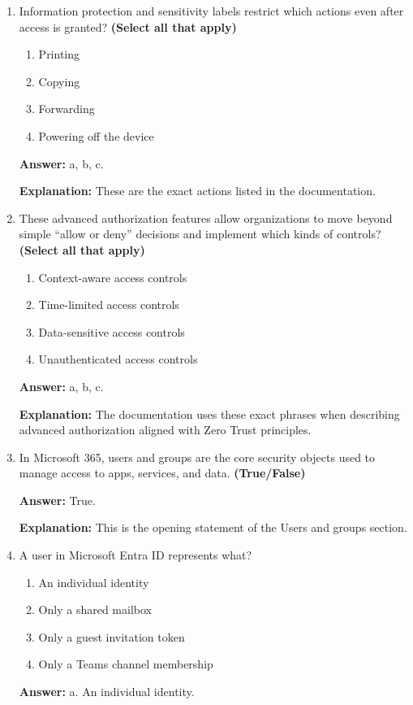 \documentclass[10pt]{article}
\begin{document}
\begin{enumerate}[leftmargin=*]
\textbf{Explanation:} The documentation says Access Packages are useful for onboarding employees or external collaborators needing timed access.

\item Information protection and sensitivity labels restrict which actions even after access is granted? \textbf{(Select all that apply)}
\begin{enumerate}[label=\alph*., leftmargin=1.5em]
\item Printing
\item Copying
\item Forwarding
\item Powering off the device
\end{enumerate}
\textbf{Answer:} a, b, c.

\textbf{Explanation:} These are the exact actions listed in the documentation.

\item These advanced authorization features allow organizations to move beyond simple ``allow or deny'' decisions and implement which kinds of controls? \textbf{(Select all that apply)}
\begin{enumerate}[label=\alph*., leftmargin=1.5em]
\item Context-aware access controls
\item Time-limited access controls
\item Data-sensitive access controls
\item Unauthenticated access controls
\end{enumerate}
\textbf{Answer:} a, b, c.

\textbf{Explanation:} The documentation uses these exact phrases when describing advanced authorization aligned with Zero Trust principles.

\item In Microsoft 365, users and groups are the core security objects used to manage access to apps, services, and data. \textbf{(True/False)}

\textbf{Answer:} True.

\textbf{Explanation:} This is the opening statement of the Users and groups section.

\item A user in Microsoft Entra ID represents what?
\begin{enumerate}[label=\alph*., leftmargin=1.5em]
\item An individual identity
\item Only a shared mailbox
\item Only a guest invitation token
\item Only a Teams channel membership
\end{enumerate}
\textbf{Answer:} a. An individual identity.


\end{enumerate}
\end{document}
